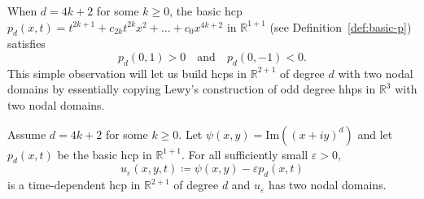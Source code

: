 \documentclass[AHL,Unicode,longabstracts,published]{cedram}
\newcommand{\R}{\mathbb{R}}
\renewcommand{\Im}{\mathrm{Im}}
\renewcommand{\epsilon}{\varepsilon}
\newcommand{\R}{\mathbb{R}}
\begin{document}
When $d=4k+2$ for some $k\geq 0$, the basic hcp $p_d(x,t)=t^{2k+1}+c_{2k}t^{2k}x^2+\dots+c_0 x^{4k+2}$ in $\R^{1+1}$ (see Definition~\ref{def:basic-p}) satisfies
\begin{equation*}\label{pd-odd}
p_d(0,1)>0\quad\text{and}\quad p_d(0,-1)<0.
\end{equation*}
This simple observation will let us build hcps in $\R^{2+1}$ of degree $d$ with two nodal domains by essentially copying Lewy's construction of odd degree hhps in $\R^3$ with two nodal domains.

\begin{theo}\label{thm:2mod4}
Assume $d=4k+2$ for some $k\geq 0$. Let $\psi(x,y)=\Im((x+iy)^d)$ and let $p_d(x,t)$ be the basic hcp in $\R^{1+1}$. For all sufficiently small $\epsilon>0$,
\begin{equation}
u_\epsilon(x,y,t) \coloneqq \psi(x,y) - \epsilon p_d(x,t) \label{eqn:lewy_u}
\end{equation}
is a time-dependent hcp in $\R^{2+1}$ of degree $d$ and $u_\epsilon$ has two nodal domains.
\end{theo}
\end{document}
